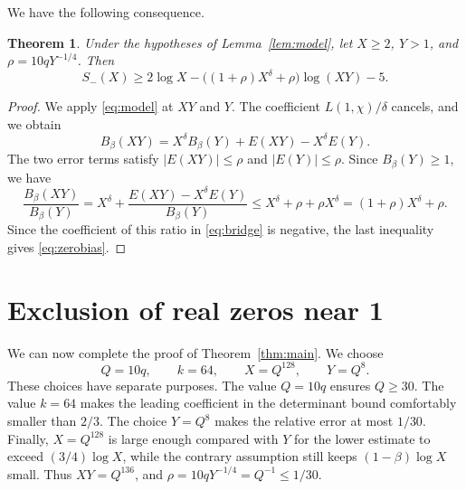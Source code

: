 \documentclass[11pt,twoside,leqno]{article}
\theoremstyle{apostol}
\newtheorem{theorem}{Theorem}
\begin{document}
We have the following consequence.

\begin{theorem}\label{thm:bias}
Under the hypotheses of Lemma~\ref{lem:model}, let \(X\ge2\),
\(Y>1\), and \(\rho=10qY^{-1/4}\). Then
\begin{equation}\label{eq:zerobias}
 S_-(X)\ge2\log X
       -\bigl((1+\rho)X^\delta+\rho\bigr)\log(XY)-5.
\end{equation}
\end{theorem}

\begin{proof}
We apply \eqref{eq:model} at \(XY\) and \(Y\). The coefficient
\(L(1,\chi)/\delta\) cancels, and we obtain
\[
 B_\beta(XY)=X^\delta B_\beta(Y)+E(XY)-X^\delta E(Y).
\]
The two error terms satisfy \(|E(XY)|\le\rho\) and \(|E(Y)|\le\rho\). Since
\(B_\beta(Y)\ge1\), we have
\[
 \frac{B_\beta(XY)}{B_\beta(Y)}
 =X^\delta+\frac{E(XY)-X^\delta E(Y)}{B_\beta(Y)}
 \le X^\delta+\rho+\rho X^\delta
 =(1+\rho)X^\delta+\rho.
\]
Since the coefficient of this ratio in \eqref{eq:bridge} is negative,
the last inequality gives \eqref{eq:zerobias}.
\end{proof}

\section{Exclusion of real zeros near 1}
\label{sec:finish}

We can now complete the proof of Theorem~\ref{thm:main}.
We choose
\begin{equation}\label{eq:parameters}
 Q=10q,\qquad k=64,\qquad X=Q^{128},\qquad Y=Q^8.
\end{equation}
These choices have separate purposes. The value \(Q=10q\) ensures
\(Q\ge30\). The value \(k=64\) makes the leading coefficient in the
determinant bound comfortably smaller than \(2/3\). The choice \(Y=Q^8\)
makes the relative error at most \(1/30\). Finally, \(X=Q^{128}\) is large
enough compared with \(Y\) for the lower estimate to exceed
\((3/4)\log X\), while the contrary assumption still keeps
\((1-\beta)\log X\) small.
Thus \(XY=Q^{136}\), and
\(\rho=10qY^{-1/4}=Q^{-1}\le1/30\).
\end{document}
